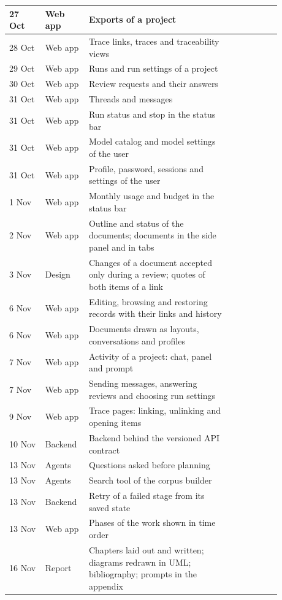 \begin{appendices}
\begin{longtable}{|p{0.12\linewidth}|p{0.12\linewidth}|p{0.48\linewidth}|p{0.16\linewidth}|}
    27 Oct & Web app & Exports of a project & \\ \hline
    28 Oct & Web app & Trace links, traces and traceability views & \\ \hline
    29 Oct & Web app & Runs and run settings of a project & \\ \hline
    30 Oct & Web app & Review requests and their answers & \\ \hline
    31 Oct & Web app & Threads and messages & \\ \hline
    31 Oct & Web app & Run status and stop in the status bar & \\ \hline
    31 Oct & Web app & Model catalog and model settings of the user & \\ \hline
    31 Oct & Web app & Profile, password, sessions and settings of the user & \\ \hline
    1 Nov & Web app & Monthly usage and budget in the status bar & \\ \hline
    2 Nov & Web app & Outline and status of the documents; documents in the side panel and in tabs & \\ \hline
    3 Nov & Design & Changes of a document accepted only during a review; quotes of both items of a link & \\ \hline
    6 Nov & Web app & Editing, browsing and restoring records with their links and history & \\ \hline
    6 Nov & Web app & Documents drawn as layouts, conversations and profiles & \\ \hline
    7 Nov & Web app & Activity of a project: chat, panel and prompt & \\ \hline
    7 Nov & Web app & Sending messages, answering reviews and choosing run settings & \\ \hline
    9 Nov & Web app & Trace pages: linking, unlinking and opening items & \\ \hline
    10 Nov & Backend & Backend behind the versioned API contract & \\ \hline
    13 Nov & Agents & Questions asked before planning & \\ \hline
    13 Nov & Agents & Search tool of the corpus builder & \\ \hline
    13 Nov & Backend & Retry of a failed stage from its saved state & \\ \hline
    13 Nov & Web app & Phases of the work shown in time order & \\ \hline
    16 Nov & Report & Chapters laid out and written; diagrams redrawn in UML; bibliography; prompts in the appendix & \\ \hline

\end{longtable}
\end{appendices}
